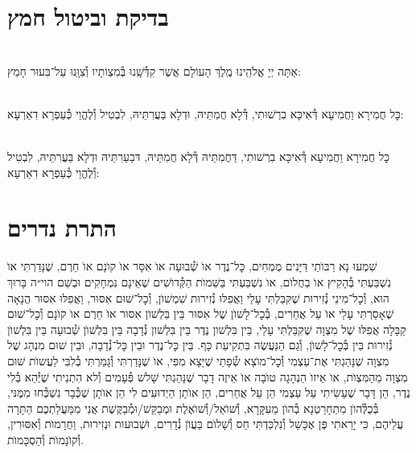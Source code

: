 \documentclass[twoside, openany, parskip=half, 11pt]{book}
\begin{document}
\chapter[בדיקת וביטול חמץ]{ בדיקת וביטול חמץ }

\\
אַתָּה יְיָ אֱלֹהֵֽינוּ מֶֽלֶךְ הָעוֹלָם אֲשֶׁר קִדְּ֯שָֽׁנוּ בְּ֯מִצְוֹתָיו וְ֯צִוָּֽנוּ עַל־בִּעוּר חָמֵץ:


\\
כׇּל חֲמִירָא וַחֲמִיעָא דְּ֯אִיכָּא בִרְשׁוּתִי, דְּ֯לָא חֲמִתֵּיהּ, וּדְלָא בַּעֲרִתֵּיהּ, לִבְטִיל וְ֯לֶהֱוֵי כְּ֯עַפְרָא דִאַרְעָא:


\\
כׇּל חֲמִירָא וַחֲמִיעָא דְּ֯אִיכָּא בִרְשׁוּתִי, דַּחֲמִתֵּיהּ דְּ֯לָא חֲמִתֵּיהּ, דּבַעַרִתֵּיהּ וּדְלָא בַּעֲרִתֵּיהּ, לִבְטִיל וְ֯לֶהֱוֵי כְּ֯עַפְרָא דִאַרְעָא:



\chapter[התרת נדרים]{ התרת נדרים }


שִׁמְעוּ נָא רַבּוׂתַי דַּיָּנִים מֻמְחִים, כׇּל־נֶדֶר אוׂ שְׁ֯בוּעָה אוׂ אִסָּר אוׂ קוׂנָם אוׂ חֵרֶם, שֶׁנָּדַרְתִּי אוׂ נִשְׁבַּעְתִּי בְּ֯הָקִיץ אוׂ בַחֲלוׂם, אוׂ נִשְׁבַּעְתִּי בַּשֵּׁמוׂת הַקְּ֯דוׂשִׁים שֶׁאֵינָם נִמְחָקִים וּבְשֵׁם הוי״ה בָּרוּךְ הוּא, וְ֯כׇל־מִינֵי נְ֯זִירוּת שֶׁקִּבַּלְתִּי עָלַי וַאֲפִלּוּ נְ֯זִירוּת שִׁמְשׁוׂן, וְ֯כׇל־שׁוּם אִסּוּר, וַאֲפִלּוּ אִסּוּר הֲנָאָה שֶׁאָסַרְתִּי עָלַי אוׂ עַל אֲחֵרִים, בְּ֯כׇל־לָשׁוׂן שֶׁל אִסּוּר בֵּין בִּלְשׁוׂן אִסּוּר אוׂ חֵרֶם אוׂ קוׂנָם וְ֯כׇל־שׁוּם קַבָּלָה אֲפִלּוּ שֶׁל מִצְוָה שֶׁקִּבַּלְתִּי עָלַי, בֵּין בִּלְשׁון נֶדֶר בֵּין בִּלְשׁון נְ֯דָבָה בֵּין בִּלְשׁוׂן שְׁ֯בוּעָה בֵּין בִּלְשׁוׂן נְ֯זִירוּת בֵּין בְּ֯כׇל־לָשׁוׂן, וְ֯גַם הַנַּעֲשֶׂה בִּתְקִיעַת כָּף. בֵּין כׇּל־נֶדֶר וּבֵין כׇּל־נְ֯דָבָה, וּבֵין שׁוּם מִנְהָג שֶׁל מִצְוָה שֶׁנָּהַגְתִּי אֶת־עַצְמִי וְ֯כׇל־מוׂצָא שְׂ֯פָתַי שֶׁיָּצָא מִפִּי, אוׂ שֶׁנָּדַרְתִּי וְ֯גָמַרְתִּי בְ֯לִבִּי לַעֲשוׂת שׁוּם מִצְוָה מֵהַמִּצְוׂת, אוׂ אֵיזוׂ הַנְהָגָה טוׂבָה אוׂ אֵיזֶה דָבָר שֶׁנָּהַגְתִּי שָׁלשׁ פְּ֯עָמִים וְ֯לא הִתְנֵיתִי שֶׁיְּ֯הֵא בְּ֯לִי נֶדֶר, הֵן דָּבָר שֶׁעָשִׂיתִי עַל עַצְמִי הֵן עַל אֲחֵרִים, הֵן אוׂתָן הַיְדוּעִים לִי הֵן אוׂתָן שֶׁכְּ֯בָר נִשְׁכְּ֯חוּ מִמֶּנּי, בְּ֯כֻלְּ֯הוׂן מִתְחָרַטְנָא בְ֯הוׂן מֵעִקָּרָא, וְ֯שׁוׂאֵל/וְ֯שׁוׂאֶלֶת וּמְבַקֵּשׁ/וּמְ֯בַקֶּשֶׁת אֲנִי מִמַּעֲלַתְכֶם הַתָּרָה עֲלֵיהֶם, כִּי יָרֵאתִי פֶּן אֶכָּשֵׁל וְ֯נִלְכַּדְתִּי חַס וְ֯שָׁלוׂם בַּעֲוׂן נְ֯דָרִים, וּשְׁבוּעות וּנְזִירוּת, וַחֲרָמוׂת וְ֯אִסּוּרִין, וְ֯קוׂנָמוׂת וְ֯הַסְכָּמוׂת.
\end{document}
